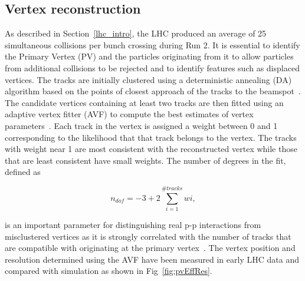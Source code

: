 \subsection{Vertex reconstruction}

As described in Section~\ref{lhc_intro}, the LHC produced an average of 25 simultaneous collisions per bunch crossing
during Run 2. It is essential to identify the Primary Vertex (PV) and the particles originating from it to allow 
particles from additional collisions to be rejected and to identify features such as displaced vertices. The tracks
are initially clustered using a deterministic annealing (DA) algorithm based on the points of closest approach of the 
tracks to the beamspot~\cite{tracker_vertex}. The candidate vertices containing at least two tracks are then
fitted using an adaptive vertex fitter (AVF) to compute the best estimates of vertex parameters~\cite{tracker_avf}. 
Each track in the vertex is assigned a weight between 0 and 1 corresponding to the likelihood that that track
belongs to the vertex. The tracks with weight near 1 are most consistent with the reconstructed vertex while
those that are least consistent have small weights. The number of degrees in the fit, defined as 

\begin{equation}
n_{dof} = -3 + 2 \sum_{i=1}^{\#tracks} wi,
\end{equation}

is an important parameter for distinguishing real p-p interactions from misclustered vertices 
as it is strongly correlated with the number of tracks that are compatible 
with originating at the primary vertex~\cite{tracker_vertex}. The vertex
position and resolution determined using the AVF have been 
measured in early LHC data and compared with simulation as shown in Fig~\ref{fig:pvEffRes}.

